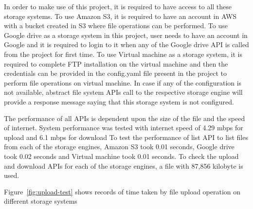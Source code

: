 In order to make use of this project, it is required to have access to
all these storage systems. To use Amazon S3, it is required to have an
account in AWS with a bucket created in S3 where file operations can
be performed. To use Google drive as a storage system in this project,
user needs to have an account in Google and it is required to login to
it when any of the Google drive API is called from the project for
first time. To use Virtual machine as a storage system, it is required
to complete FTP installation on the virtual machine and then the
credentials can be provided in the config.yaml file present in the
project to perform file operations on virtual machine.  In case if any
of the configuration is not available, abstract file system APIs call
to the respective storage engine will provide a response message
saying that this storage system is not configured.

The performance of all APIs is dependent upon the size of the file and
the speed of internet. System performance was tested with internet
speed of 4.29 mbps for upload and 6.1 mbps for download To test the
performance of list API to list files from each of the storage
engines, Amazon S3 took 0.01 seconds, Google drive took 0.02 seconds
and Virtual machine took 0.01 seconds.  To check the upload and
download APIs for each of the storage engines, a file with 87,856
kilobyte is used.

Figure~\ref{fig:upload-test} shows records of time taken 
by file upload operation on different storage systems

